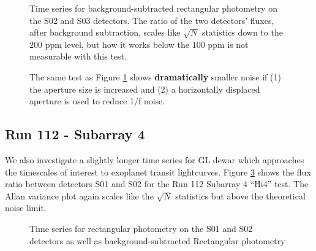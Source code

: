 \documentclass{aastex62}
\begin{document}
\begin{figure}
\caption{Time series for background-subtracted rectangular photometry on the S02 and S03 detectors.
The ratio of the two detectors' fluxes, after background subtraction, scales like $\sqrt{N}$ statistics down to the 200 ppm level, but how it works below the 100 ppm is not measurable with this test.}\label{fig:GLtSeriesAcrossDetectors}
\end{figure}

\begin{figure}
\caption{The same test as Figure \ref{fig:GLtSeriesAcrossDetectors} shows {\bf dramatically} smaller noise if (1) the aperture size is increased and (2) a horizontally displaced aperture is used to reduce 1/f noise.}\label{fig:GLtSeriesRun112}
\end{figure}

\clearpage

\subsection{Run 112 - Subarray 4}
We also investigate a slightly longer time series for GL dewar which approaches the timescales of interest to exoplanet transit lightcurves.
Figure \ref{fig:GLtSeriesRun112} shows the flux ratio between detectors S01 and S02 for the Run 112 Subarray 4 ``Hi4'' test.
The Allan variance plot again scales like the $\sqrt{N}$ statistics but above the theoretical noise limit.

\begin{figure}
\caption{Time series for rectangular photometry on the S01 and S02 detectors as well as background-subtracted Rectangular photometry}\label{fig:GLtSeriesRun112}
\end{figure}
\end{document}
